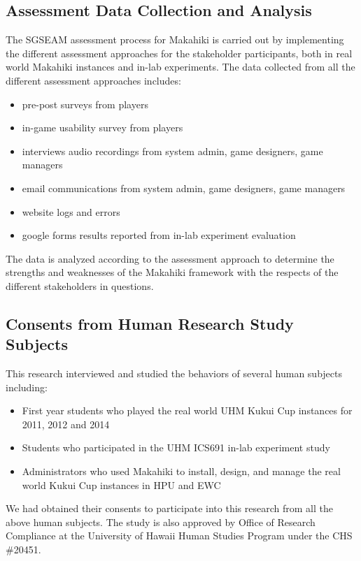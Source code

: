 \subsection{Assessment Data Collection and Analysis}

The SGSEAM assessment process for Makahiki is carried out by implementing the different assessment approaches for the stakeholder participants, both in real world Makahiki instances and in-lab experiments. The data collected from all the different assessment approaches includes:

\begin{itemize}
\item pre-post surveys from players
\item in-game usability survey from players
\item interviews audio recordings from system admin, game designers, game managers
\item email communications from system admin, game designers, game managers
\item website logs and errors
\item google forms results reported from in-lab experiment evaluation
\end{itemize}

The data is analyzed according to the assessment approach to determine the strengths and weaknesses of the Makahiki framework with the respects of the different stakeholders in questions.

\subsection{Consents from Human Research Study Subjects}
This research interviewed and studied the behaviors of several human subjects including:

\begin{itemize}
\item First year students who played the real world UHM Kukui Cup instances for 2011, 2012 and 2014
\item Students who participated in the UHM ICS691 in-lab experiment study
\item Administrators who used Makahiki to install, design, and manage the real world Kukui Cup instances in HPU and EWC
\end{itemize}

We had obtained their consents to participate into this research from all the above human subjects. The study is also approved by Office of Research Compliance at the University of Hawaii Human Studies Program under the CHS \#20451.